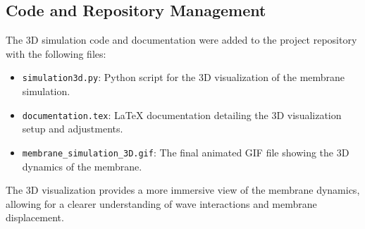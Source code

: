 \documentclass{article}
\begin{document}
\subsection{Code and Repository Management}
The 3D simulation code and documentation were added to the project repository with the following files:
\begin{itemize}
    \item \texttt{simulation3d.py}: Python script for the 3D visualization of the membrane simulation.
    \item \texttt{documentation.tex}: LaTeX documentation detailing the 3D visualization setup and adjustments.
    \item \texttt{membrane\_simulation\_3D.gif}: The final animated GIF file showing the 3D dynamics of the membrane.
\end{itemize}

The 3D visualization provides a more immersive view of the membrane dynamics, allowing for a clearer understanding of wave interactions and membrane displacement.
\end{document}
